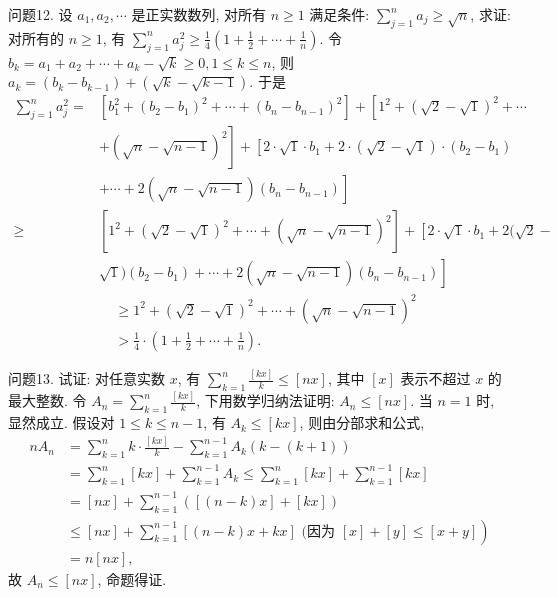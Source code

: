 问题12. 设 $a_1, a_2, \cdots$ 是正实数数列, 对所有 $n \geqslant 1$ 满足条件: $\sum_{j=1}^n a_j \geqslant \sqrt{n}$, 求证: 对所有的 $n \geqslant 1$, 有 $\sum_{j=1}^n a_j^2 \geqslant \frac{1}{4}\left(1+\frac{1}{2}+\cdots+\frac{1}{n}\right)$.
令 $b_k=a_1+a_2+\cdots+a_k-\sqrt{k} \geqslant 0,1 \leqslant k \leqslant n$, 则 $a_k=\left(b_k-b_{k-1}\right)+ (\sqrt{k}-\sqrt{k-1})$. 于是
$$
\begin{aligned}
\sum_{j=1}^n a_j^2= & {\left[b_1^2+\left(b_2-b_1\right)^2+\cdots+\left(b_n-b_{n-1}\right)^2\right]+\left[1^2+(\sqrt{2}-\sqrt{1})^2+\cdots\right.} \\
& \left.+(\sqrt{n}-\sqrt{n-1})^2\right]+\left[2 \cdot \sqrt{1} \cdot b_1+2 \cdot(\sqrt{2}-\sqrt{1}) \cdot\left(b_2-b_1\right)\right. \\
& \left.+\cdots+2(\sqrt{n}-\sqrt{n-1})\left(b_n-b_{n-1}\right)\right] \\
\geqslant & {\left[1^2+(\sqrt{2}-\sqrt{1})^2+\cdots+(\sqrt{n}-\sqrt{n-1})^2\right]+\left[2 \cdot \sqrt{1} \cdot b_1+2(\sqrt{2}-\right.} \\
& \left.\sqrt{1})\left(b_2-b_1\right)+\cdots+2(\sqrt{n}-\sqrt{n-1})\left(b_n-b_{n-1}\right)\right]
\end{aligned}
$$
$$
\begin{aligned}
& \geqslant 1^2+(\sqrt{2}-\sqrt{1})^2+\cdots+(\sqrt{n}-\sqrt{n-1})^2 \\
& >\frac{1}{4} \cdot\left(1+\frac{1}{2}+\cdots+\frac{1}{n}\right) .
\end{aligned}
$$



问题13. 试证: 对任意实数 $x$, 有 $\sum_{k=1}^n \frac{[k x]}{k} \leqslant[n x]$, 其中 $[x]$ 表示不超过 $x$ 的最大整数.
令 $A_n=\sum_{k=1}^n \frac{[k x]}{k}$, 下用数学归纳法证明: $A_n \leqslant[n x]$.
当 $n=1$ 时, 显然成立.
假设对 $1 \leqslant k \leqslant n-1$, 有 $A_k \leqslant[k x]$, 则由分部求和公式,
$$
\begin{aligned}
n A_n & =\sum_{k=1}^n k \cdot \frac{[k x]}{k}-\sum_{k=1}^{n-1} A_k(k-(k+1)) \\
& =\sum_{k=1}^n[k x]+\sum_{k=1}^{n-1} A_k \leqslant \sum_{k=1}^n[k x]+\sum_{k=1}^{n-1}[k x] \\
& =[n x]+\sum_{k=1}^{n-1}([(n-k) x]+[k x]) \\
& \left.\leqslant[n x]+\sum_{k=1}^{n-1}[(n-k) x+k x] \text { (因为 }[x]+[y] \leqslant[x+y]\right) \\
& =n[n x],
\end{aligned}
$$
故 $A_n \leqslant[n x]$, 命题得证.



